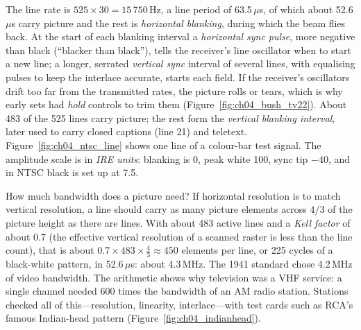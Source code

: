 The line rate is $525\times30=15\,750$\,Hz, a line period of 63.5\,$\mu$s, of which about 52.6\,$\mu$s carry
picture and the rest is \emph{horizontal blanking}, during which the beam flies back. At the start of each
blanking interval a \emph{horizontal sync pulse}, more negative than black (``blacker than black''), tells the
receiver's line oscillator when to start a new line; a longer, serrated \emph{vertical sync} interval of
several lines, with equalising pulses to keep the interlace accurate, starts each field. If the receiver's oscillators drift too far from the transmitted rates, the picture
rolls or tears, which is why early sets had \emph{hold} controls to trim them (Figure~\ref{fig:ch04_bush_tv22}).
About 483 of the 525 lines carry picture; the rest form the \emph{vertical blanking interval}, later used to carry closed captions
(line 21) and teletext. Figure~\ref{fig:ch04_ntsc_line} shows one line of a colour-bar test signal. The
amplitude scale is in \emph{IRE units}: blanking is 0, peak white 100, sync tip $-40$, and in NTSC black is
set up at 7.5.



How much bandwidth does a picture need? If horizontal resolution is to match vertical resolution, a line
should carry as many picture elements across $4/3$ of the picture height as there are lines. With about 483
active lines and a \emph{Kell factor} of about 0.7 (the effective vertical resolution of a scanned raster is
less than the line count), that is about $0.7\times483\times\frac43\approx450$ elements per line, or 225
cycles of a black-white pattern, in 52.6\,$\mu$s: about 4.3\,MHz. The 1941 standard chose 4.2\,MHz of video
bandwidth. The arithmetic shows why television was a VHF service: a single channel needed 600 times the
bandwidth of an AM radio station. Stations checked all of this---resolution, linearity, interlace---with test
cards such as RCA's famous Indian-head pattern (Figure~\ref{fig:ch04_indianhead}).

